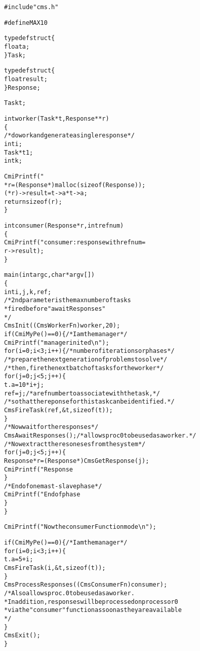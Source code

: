 \begin{alltt}
#include "cms.h"

#define MAX 10

typedef struct \{
    float a;
\} Task;

typedef struct \{
    float result;
\} Response;

Task t;

int worker(Task *t, Response **r)
\{
    /* do work and generate a single response */
    int i;
    Task *t1;
    int k;

    CmiPrintf("%d: in worker %f \verb+\n+", CmiMyPe(), t->a);
    *r = (Response *) malloc(sizeof(Response));
    (*r)->result = t->a * t->a;
    return sizeof(r);
\}

int consumer(Response * r, int refnum)
\{
    CmiPrintf("consumer: response with refnum = %d is %f\verb+\n+", refnum,
              r->result);
\}

main(int argc, char *argv[])
\{
    int i, j, k, ref;
    /* 2nd parameter is the max number of tasks 
     * fired before "awaitResponses"
     */
    CmsInit((CmsWorkerFn)worker, 20);
    if (CmiMyPe() == 0) \{ /* I am the manager */
        CmiPrintf("manager inited\verb+\n+");
        for (i = 0; i < 3; i++) \{ /* number of iterations or phases */
          /* prepare the next generation of problems to solve */
          /* then, fire the next batch of tasks for the worker */
            for (j = 0; j < 5; j++) \{
                t.a = 10 * i + j;
                ref = j;  /* a ref number to associate with the task, */
                /* so that the reponse for this task can be identified. */
                CmsFireTask(ref, \&t, sizeof(t));
            \}
          /* Now wait for the responses */
            CmsAwaitResponses();  /* allows proc 0 to be used as a worker. */
            /* Now extract the resoneses from the system */
            for (j = 0; j < 5; j++) \{
                Response *r = (Response *) CmsGetResponse(j);
                CmiPrintf("Response %d is: %f \verb+\n+", j, r->result);
            \}
          /* End of one mast-slave phase */
            CmiPrintf("End of phase %d\verb+\n+", i);
        \}
    \}

    CmiPrintf("Now the consumerFunction mode\verb+\n+");

    if (CmiMyPe() == 0) \{ /* I am the manager */
       for (i = 0; i < 3; i++) \{
           t.a = 5 + i;
           CmsFireTask(i, \&t, sizeof(t));
       \}
       CmsProcessResponses((CmsConsumerFn)consumer);
       /* Also allows proc. 0 to be used as a worker. 
        * In addition, responses will be processed on processor 0 
        * via the "consumer" function as soon as they are available 
        */
    \}
    CmsExit();
\}
\end{alltt}
